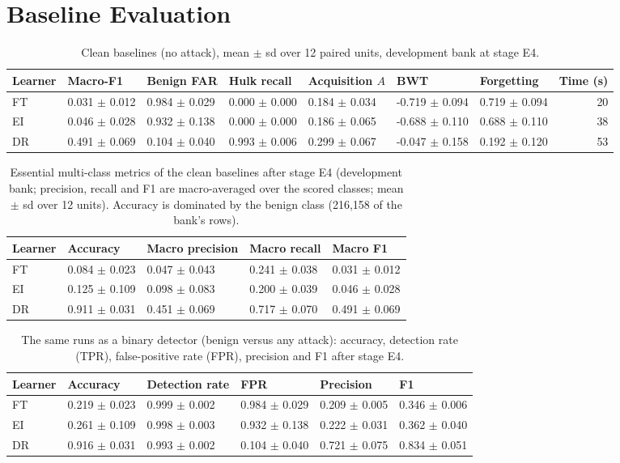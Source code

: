 \documentclass[10pt,a4paper]{article}
\begin{document}
\section{Baseline Evaluation}\label{sec:base}
\begin{table}[htbp]
\centering\footnotesize
\caption{Clean baselines (no attack), mean $\pm$ sd over 12 paired units, development bank at stage E4.}
\label{tab:baselines}
\begin{tabularx}{\linewidth}{lYYYYYYr}
\toprule
Learner & Macro-F1 & Benign FAR & Hulk recall & Acquisition $A$ & BWT & Forgetting & Time (s)\\
\midrule
FT & 0.031 $\pm$ 0.012 & 0.984 $\pm$ 0.029 & 0.000 $\pm$ 0.000 & 0.184 $\pm$ 0.034 & -0.719 $\pm$ 0.094 & 0.719 $\pm$ 0.094 & 20\\
EI & 0.046 $\pm$ 0.028 & 0.932 $\pm$ 0.138 & 0.000 $\pm$ 0.000 & 0.186 $\pm$ 0.065 & -0.688 $\pm$ 0.110 & 0.688 $\pm$ 0.110 & 38\\
DR & 0.491 $\pm$ 0.069 & 0.104 $\pm$ 0.040 & 0.993 $\pm$ 0.006 & 0.299 $\pm$ 0.067 & -0.047 $\pm$ 0.158 & 0.192 $\pm$ 0.120 & 53\\
\bottomrule
\end{tabularx}
\end{table}
\begin{table}[htbp]
\centering\footnotesize
\caption{Essential multi-class metrics of the clean baselines after stage E4 (development bank; precision, recall and F1 are macro-averaged over the scored classes; mean $\pm$ sd over 12 units). Accuracy is dominated by the benign class (216,158 of the bank's rows).}
\label{tab:ess}
\begin{tabularx}{\linewidth}{lYYYY}
\toprule
Learner & Accuracy & Macro precision & Macro recall & Macro F1\\
\midrule
FT & 0.084 $\pm$ 0.023 & 0.047 $\pm$ 0.043 & 0.241 $\pm$ 0.038 & 0.031 $\pm$ 0.012\\
EI & 0.125 $\pm$ 0.109 & 0.098 $\pm$ 0.083 & 0.200 $\pm$ 0.039 & 0.046 $\pm$ 0.028\\
DR & 0.911 $\pm$ 0.031 & 0.451 $\pm$ 0.069 & 0.717 $\pm$ 0.070 & 0.491 $\pm$ 0.069\\
\bottomrule
\end{tabularx}
\end{table}
\begin{table}[htbp]
\centering\footnotesize
\caption{The same runs as a binary detector (benign versus any attack): accuracy, detection rate (TPR), false-positive rate (FPR), precision and F1 after stage E4.}
\label{tab:bin}
\begin{tabularx}{\linewidth}{lYYYYY}
\toprule
Learner & Accuracy & Detection rate & FPR & Precision & F1\\
\midrule
FT & 0.219 $\pm$ 0.023 & 0.999 $\pm$ 0.002 & 0.984 $\pm$ 0.029 & 0.209 $\pm$ 0.005 & 0.346 $\pm$ 0.006\\
EI & 0.261 $\pm$ 0.109 & 0.998 $\pm$ 0.003 & 0.932 $\pm$ 0.138 & 0.222 $\pm$ 0.031 & 0.362 $\pm$ 0.040\\
DR & 0.916 $\pm$ 0.031 & 0.993 $\pm$ 0.002 & 0.104 $\pm$ 0.040 & 0.721 $\pm$ 0.075 & 0.834 $\pm$ 0.051\\
\bottomrule
\end{tabularx}
\end{table}
\end{document}
